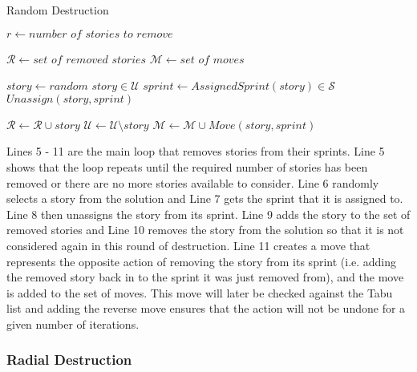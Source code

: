 \begin{algorithm}[H]
\caption{Random Destruction}\label{random_destruction}
\begin{algorithmic}[1]
    \State $r \gets \textit{number of stories to remove}$
    
        \State $\mathcal{R} \gets \textit{set of removed stories}$
        \State $\mathcal{M} \gets \textit{set of moves}$
        
            \State $story \gets \textit{random story} \in \mathcal{U}$
            \State $sprint \gets AssignedSprint(story) \in \mathcal{S}$
            \State $Unassign(story, sprint)$
            
            \State $\mathcal{R} \gets \mathcal{R} \cup story$
            \State $\mathcal{U} \gets \mathcal{U} \setminus story$
            \State $\mathcal{M} \gets \mathcal{M} \cup Move(story, sprint)$
        \EndWhile
        
        \State {}
    \EndProcedure
\end{algorithmic}
\end{algorithm}

Lines 5 - 11 are the main loop that removes stories from their sprints. Line 5 shows that the loop repeats until the required number of stories has been removed or there are no more stories available to consider. Line 6 randomly selects a story from the solution and Line 7 gets the sprint that it is assigned to. Line 8 then unassigns the story from its sprint. Line 9 adds the story to the set of removed stories and Line 10 removes the story from the solution so that it is not considered again in this round of destruction. Line 11 creates a move that represents the opposite action of removing the story from its sprint (i.e. adding the removed story back in to the sprint it was just removed from), and the move is added to the set of moves. This move will later be checked against the Tabu list and adding the reverse move ensures that the action will not be undone for a given number of iterations.

\subsubsection{Radial Destruction}

